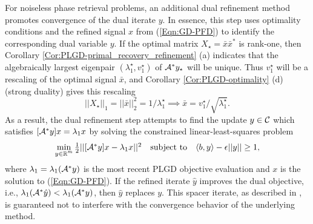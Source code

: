 For noiseless phase retrieval problems, an additional dual refinement method promotes convergence of the dual iterate $y$.  In essence, this step uses optimality conditions and the refined signal $x$ from (\ref{Eqn:GD-PFD}) to identify the corresponding dual variable $y$.  If the optimal matrix $X_\star = \bar{x}\bar{x}^*$ is rank-one, then Corollary \ref{Cor:PLGD-primal_recovery_refinement} (a) indicates that the algebraically largest eigenpair $(\lambda_1^\star, v_1^\star)$ of ${\mathcal A}^*y_\star$ will be unique.  Thus $v_1^\star$ will be a rescaling of the optimal signal $\bar{x}$, and  Corollary \ref{Cor:PLGD-optimality} (d) (strong duality) gives this rescaling
\[
||X_\star||_1 = ||\bar{x}||_2^2 = 1/ \lambda_1^\star \implies \bar{x} = v_1^\star / \sqrt{\lambda_1^\star}.
\]  
As a result, the dual refinement step attempts to find the update $y \in {\mathcal C}$ which satisfies $ [{\mathcal A}^* y]x = \lambda_1 x$ by solving the constrained linear-least-squares problem
\begin{equation} 	\label{Eqn:GD-DFP}
\begin{array}{lcr}
\min\limits_{\substack{ y \in \mathbb{R}^m}} \frac{1}{2} || [{\mathcal A}^* y]x - \lambda_1 x ||^2
	&	\textnormal{subject to} 	&	 \langle b, y \rangle - \epsilon ||y|| \geq 1,
\end{array}
\end{equation}
where $\lambda_1 = \lambda_1 ({\mathcal A}^*y)$ is the most recent PLGD objective evaluation and $x$ is the solution to (\ref{Eqn:GD-PFD}).  If the refined iterate $\hat{y}$ improves the dual objective, i.e., $\lambda_1 ({\mathcal A}^*\hat{y}) < \lambda_1 ({\mathcal A}^*y)$, then $\hat{y}$ replaces $y$.  This spacer iterate, as described in \cite[Proposition 1.2.5]{bertsekas2016nonlinear}, is guaranteed not to interfere with the convergence behavior of the underlying method.




